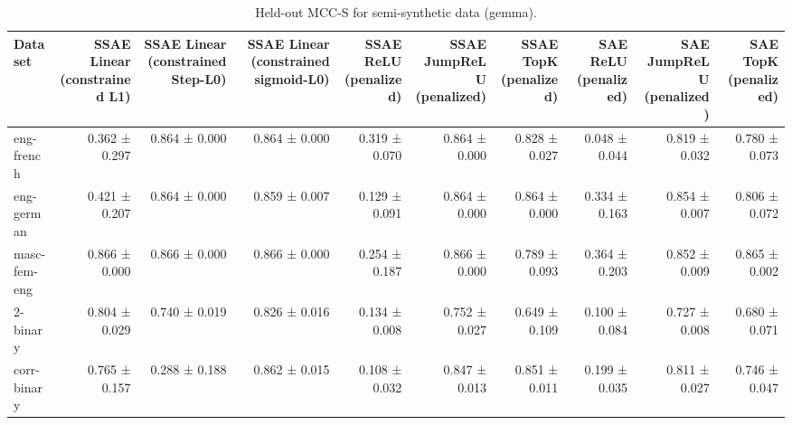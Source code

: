 \begin{table}[t]
\centering
\caption{Held-out MCC-S for semi-synthetic data (gemma).}
\label{tab:semisynthetic-gemma-mcc-s}
\begin{tabular}{lrrrrrrrrr}
\toprule
Dataset & SSAE Linear (constrained L1) & SSAE Linear (constrained Step-L0) & SSAE Linear (constrained sigmoid-L0) & SSAE ReLU (penalized) & SSAE JumpReLU (penalized) & SSAE TopK (penalized) & SAE ReLU (penalized) & SAE JumpReLU (penalized) & SAE TopK (penalized) \\
\midrule
eng-french & 0.362 ± 0.297 & 0.864 ± 0.000 & 0.864 ± 0.000 & 0.319 ± 0.070 & 0.864 ± 0.000 & 0.828 ± 0.027 & 0.048 ± 0.044 & 0.819 ± 0.032 & 0.780 ± 0.073 \\
eng-german & 0.421 ± 0.207 & 0.864 ± 0.000 & 0.859 ± 0.007 & 0.129 ± 0.091 & 0.864 ± 0.000 & 0.864 ± 0.000 & 0.334 ± 0.163 & 0.854 ± 0.007 & 0.806 ± 0.072 \\
masc-fem-eng & 0.866 ± 0.000 & 0.866 ± 0.000 & 0.866 ± 0.000 & 0.254 ± 0.187 & 0.866 ± 0.000 & 0.789 ± 0.093 & 0.364 ± 0.203 & 0.852 ± 0.009 & 0.865 ± 0.002 \\
2-binary & 0.804 ± 0.029 & 0.740 ± 0.019 & 0.826 ± 0.016 & 0.134 ± 0.008 & 0.752 ± 0.027 & 0.649 ± 0.109 & 0.100 ± 0.084 & 0.727 ± 0.008 & 0.680 ± 0.071 \\
corr-binary & 0.765 ± 0.157 & 0.288 ± 0.188 & 0.862 ± 0.015 & 0.108 ± 0.032 & 0.847 ± 0.013 & 0.851 ± 0.011 & 0.199 ± 0.035 & 0.811 ± 0.027 & 0.746 ± 0.047 \\
\bottomrule
\end{tabular}
\end{table}
